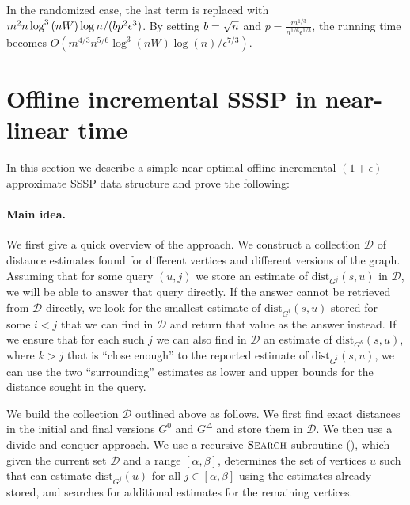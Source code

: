 \documentclass[11pt,letterpaper]{article}
\theoremstyle{plain}
\renewcommand{\O}{O}
\newcommand{\eps}{\ensuremath{\epsilon}}
\newcommand{\dist}{\mathrm{dist}}
\begin{document}
In the randomized case, the last term is replaced with
$m^2n\log^3{(nW)}\log{n}/(\phlen \reset^2 \eps^3)$.
By setting $b=\sqrt{n}$ and $p=\frac{m^{1/3}}{n^{1/6}\eps^{1/3}}$, the running time becomes
$\O(m^{4/3}n^{5/6}\log^3(nW)\log(n)/\eps^{7/3})$.
\section{Offline incremental SSSP in near-linear time}\label{sec:offline}
In this section we describe a simple near-optimal offline incremental $(1 + \epsilon)$-approximate SSSP data structure and prove the following:
\restateOfflineTheorem*

\newcommand{\Res}{\mathcal{D}}
\newcommand{\dla}{d_{\le\alpha}}
\newcommand{\dgb}{d_{\ge\beta}}
\newcommand{\dg}{d_{\gamma}}
\newcommand{\dlg}{d_{\le\gamma}}
\newcommand{\dgg}{d_{\ge\gamma}}
\newcommand{\dinit}{d_\mathrm{init}}
\newcommand{\VV}{X}

\paragraph{Main idea.}

We first give a quick overview of the approach.
We construct a collection $\Res$ of distance estimates found for different vertices and different versions of the graph.
Assuming that for some query $(u, j)$ we store an estimate of $\dist_{G^j}(s, u)$ in $\Res$, we will be able to answer that query directly.
If the answer cannot be retrieved from $\Res$ directly, we look for the smallest estimate of $\dist_{G^i}(s, u)$ stored for some $i < j$ that we can find in $\Res$ and return that value as the answer instead.
If we ensure that for each such $j$
we can also find in $\Res$ an estimate of $\dist_{G^k}(s, u)$, where $k > j$
that is ``close enough'' to the reported estimate of $\dist_{G^i}(s, u)$, we can use the two ``surrounding'' estimates as lower and upper bounds for the distance sought in the query.

We build the collection $\Res$ outlined above as follows.
We first find exact distances in the initial and final versions $G^0$ and $G^\Delta$ and store them in $\Res$.
We then use a divide-and-conquer approach.
We use a recursive $\textproc{Search}$ subroutine (), which given the current set $\Res$ and a range $[\alpha, \beta]$, determines the set of vertices $u$ such that can estimate $\dist_{G^j}(u)$ for all $j \in [\alpha, \beta]$ using the estimates already stored, and searches for additional estimates for the remaining vertices.
\end{document}
